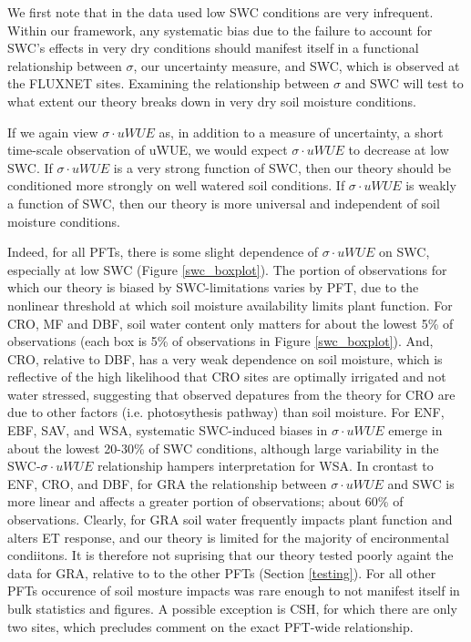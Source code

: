 \documentclass[draft,linenumbers]{agujournal}
\begin{document}
We first note that in the data used low SWC conditions are very
infrequent. Within our framework, any systematic bias due to the
failure to account for SWC's effects in very dry conditions should
manifest itself in a functional relationship between $\sigma$, our
uncertainty measure, and SWC, which is observed at the FLUXNET
sites. Examining the relationship between $\sigma$ and SWC will test
to what extent our theory breaks down in very dry soil moisture
conditions.

If we again view $\sigma \cdot uWUE$ as, in addition to a measure of
uncertainty, a short time-scale observation of uWUE, we would expect
$\sigma \cdot uWUE$ to decrease at low SWC. If $\sigma \cdot uWUE$ is
a very strong function of SWC, then our theory should be conditioned
more strongly on well watered soil conditions. If $\sigma \cdot uWUE$
is weakly a function of SWC, then our theory is more universal and
independent of soil moisture conditions.

Indeed, for all PFTs, there is some slight dependence of
$\sigma \cdot uWUE$ on SWC, especially at low SWC (Figure
\ref{swc_boxplot}). The portion of observations for which our theory
is biased by SWC-limitations varies by PFT, due to the nonlinear
threshold at which soil moisture availability limits plant
function. For CRO, MF and DBF, soil water content only matters for
about the lowest 5\% of observations (each box is 5\% of observations
in Figure \ref{swc_boxplot}). And, CRO, relative to DBF, has a very
weak dependence on soil moisture, which is reflective of the high
likelihood that CRO sites are optimally irrigated and not water
stressed, suggesting that observed depatures from the theory for CRO
are due to other factors (i.e. photosythesis pathway) than soil
moisture. For ENF, EBF, SAV, and WSA, systematic SWC-induced biases in
$\sigma \cdot uWUE$ emerge in about the lowest 20-30\% of SWC
conditions, although large variability in the SWC-$\sigma \cdot uWUE$
relationship hampers interpretation for WSA. In crontast to ENF, CRO,
and DBF, for GRA the relationship between $\sigma \cdot uWUE$ and SWC
is more linear and affects a greater portion of observations; about
60\% of observations. Clearly, for GRA soil water frequently impacts
plant function and alters ET response, and our theory is limited for
the majority of encironmental condiitons. It is therefore not
suprising that our theory tested poorly againt the data for GRA,
relative to to the other PFTs (Section \ref{testing}). For all other
PFTs occurence of soil mosture impacts was rare enough to not manifest
itself in bulk statistics and figures. A possible exception is CSH,
for which there are only two sites, which precludes comment on the
exact PFT-wide relationship.
\end{document}
